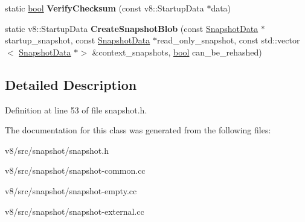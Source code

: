 \begin{DoxyCompactItemize}
static \mbox{\hyperlink{classbool}{bool}} {\bfseries Verify\+Checksum} (const v8\+::\+Startup\+Data $\ast$data)
\item 
\mbox{\label{classv8_1_1internal_1_1Snapshot_a710d1c205ea568700a0d245f6a5f0d83}} 
static v8\+::\+Startup\+Data {\bfseries Create\+Snapshot\+Blob} (const \mbox{\hyperlink{classv8_1_1internal_1_1SnapshotData}{Snapshot\+Data}} $\ast$startup\+\_\+snapshot, const \mbox{\hyperlink{classv8_1_1internal_1_1SnapshotData}{Snapshot\+Data}} $\ast$read\+\_\+only\+\_\+snapshot, const std\+::vector$<$ \mbox{\hyperlink{classv8_1_1internal_1_1SnapshotData}{Snapshot\+Data}} $\ast$$>$ \&context\+\_\+snapshots, \mbox{\hyperlink{classbool}{bool}} can\+\_\+be\+\_\+rehashed)
\end{DoxyCompactItemize}


\subsection{Detailed Description}


Definition at line 53 of file snapshot.\+h.



The documentation for this class was generated from the following files\+:\begin{DoxyCompactItemize}
\item 
v8/src/snapshot/snapshot.\+h\item 
v8/src/snapshot/snapshot-\/common.\+cc\item 
v8/src/snapshot/snapshot-\/empty.\+cc\item 
v8/src/snapshot/snapshot-\/external.\+cc\end{DoxyCompactItemize}
